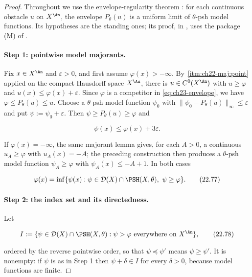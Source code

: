 \begin{proof}
Throughout we use the envelope-regularity theorem
: for each continuous obstacle \(u\) on
\(X^{\An}\), the envelope \(P_\theta(u)\) is a uniform limit of
\(\theta\)-psh model functions.  Its hypotheses are the standing ones; its
proof, in , uses the package \textup{(M)} of
.

\paragraph{Step 1: pointwise model majorants.}
Fix \(x\in X^{\An}\) and \(\varepsilon>0\), and first assume
\(\varphi(x)>-\infty\).  By
\,\cref{itm:ch22-maj:point} applied on the
compact Hausdorff space \(X^{\An}\), there is \(u\in C^0(X^{\An})\) with
\(u\geq\varphi\) and \(u(x)\leq\varphi(x)+\varepsilon\).  Since \(\varphi\)
is a competitor in \eqref{eq:ch23-envelope}, we have
\(\varphi\leq P_\theta(u)\leq u\).  Choose a \(\theta\)-psh model function
\(\psi_0\) with \(\|\psi_0-P_\theta(u)\|_\infty\leq\varepsilon\) and put
\(\psi:=\psi_0+\varepsilon\).  Then \(\psi\geq P_\theta(u)\geq\varphi\) and

\[
                         \psi(x)\leq\varphi(x)+3\varepsilon.
\tag{22.76}\label{eq:ch22-pointwise-majorant}
\]

If \(\varphi(x)=-\infty\), the same majorant lemma gives, for each
\(A>0\), a continuous \(u_A\geq\varphi\) with \(u_A(x)=-A\); the preceding
construction then produces a \(\theta\)-psh model function
\(\psi_A\geq\varphi\) with \(\psi_A(x)\leq-A+1\).  In both cases

\[
 \varphi(x)=\inf\{\psi(x):
       \psi\in\mathcal D(X)\cap\PSH(X,\theta),\ \psi\geq\varphi\}.
\tag{22.77}\label{eq:ch22-inf-majorants}
\]

\paragraph{Step 2: the index set and its directedness.}
Let

\[
 I:=\{\psi\in\mathcal D(X)\cap\PSH(X,\theta):
       \psi>\varphi\ \text{everywhere on }X^{\An}\},
\tag{22.78}\label{eq:ch22-index-set}
\]

ordered by the reverse pointwise order, so that \(\psi\preceq\psi'\) means
\(\psi\geq\psi'\).  It is nonempty: if \(\psi\) is as in Step 1 then
\(\psi+\delta\in I\) for every \(\delta>0\), because model functions are
finite.


\end{proof}
